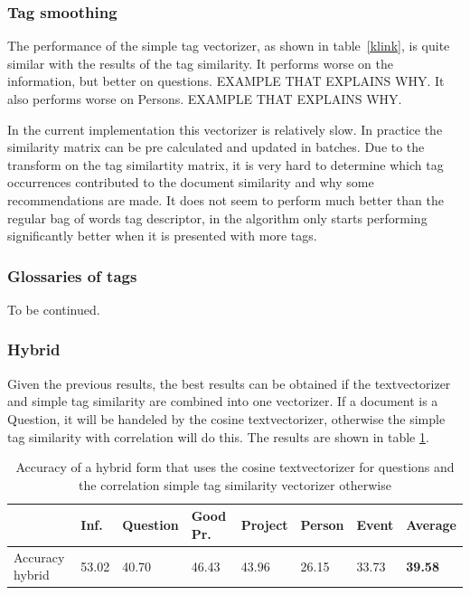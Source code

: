 \subsubsection{Tag smoothing}
The performance of the simple tag vectorizer, as shown in table~\ref{klink}, is
quite similar with the results of the tag similarity. It performs worse on the
information, but better on questions. EXAMPLE THAT EXPLAINS WHY. It also
performs worse on Persons. EXAMPLE THAT EXPLAINS WHY. 

In the current implementation this vectorizer is relatively slow. In practice
the similarity matrix can be pre calculated and updated in batches. Due to the
transform on the tag similartity matrix, it is very hard to determine which tag
occurrences contributed to the document similarity and why some recommendations
are made. It does not seem to perform much better than the regular bag of words
tag descriptor, in \citeauthor{zhou2011web} the algorithm only starts
performing significantly better when it is presented with more tags.

\subsubsection{Glossaries of tags}
To be continued.

\subsubsection{Hybrid}
Given the previous results, the best results can be obtained if the textvectorizer and simple tag similarity are combined into one vectorizer. If a document is a Question, it will be handeled by the cosine textvectorizer, otherwise the simple tag similarity with correlation will do this. The results are shown in table \ref{hybrid}. 

\begin{table}
\begin{tabular}{| l | l | l | l | l | l | l | l |}
\hline
 & Inf. &  Question &  Good Pr.& Project & Person &  Event & {\bf Average} \\
\hline
Accuracy hybrid & 53.02 & 40.70 & 46.43 & 43.96 & 26.15 & 33.73 & {\bf 39.58}\\
\hline
\end{tabular}
\caption{Accuracy of a hybrid form that uses the cosine textvectorizer for questions and the correlation simple tag similarity vectorizer otherwise}
\label{hybrid}
\end{table}

